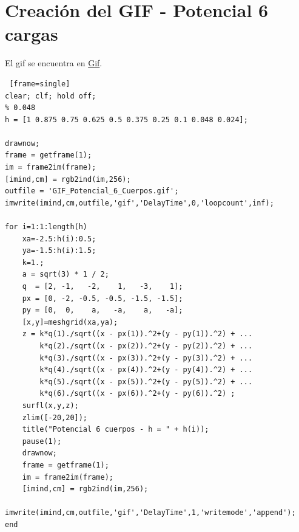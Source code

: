 \documentclass{article}
\begin{document}
\clearpage
\newpage

  
\section{Creación del GIF - Potencial 6 cargas}

El gif se encuentra en \textcolor{blue}{  \href{https://drive.google.com/file/d/1sRfifJXut2_qK32Unls1aUzsKwR2ppvl/view?usp=sharing}{Gif}}.
  
  
\begin{lstlisting} [frame=single]
clear; clf; hold off;
% 0.048
h = [1 0.875 0.75 0.625 0.5 0.375 0.25 0.1 0.048 0.024];

drawnow;
frame = getframe(1);
im = frame2im(frame);        
[imind,cm] = rgb2ind(im,256);       
outfile = 'GIF_Potencial_6_Cuerpos.gif';
imwrite(imind,cm,outfile,'gif','DelayTime',0,'loopcount',inf);

for i=1:1:length(h)
    xa=-2.5:h(i):0.5;
    ya=-1.5:h(i):1.5;
    k=1.; 
    a = sqrt(3) * 1 / 2;
    q  = [2, -1,   -2,    1,   -3,    1];
    px = [0, -2, -0.5, -0.5, -1.5, -1.5];
    py = [0,  0,    a,   -a,    a,   -a];
    [x,y]=meshgrid(xa,ya);
    z = k*q(1)./sqrt((x - px(1)).^2+(y - py(1)).^2) + ...
        k*q(2)./sqrt((x - px(2)).^2+(y - py(2)).^2) + ...
        k*q(3)./sqrt((x - px(3)).^2+(y - py(3)).^2) + ...
        k*q(4)./sqrt((x - px(4)).^2+(y - py(4)).^2) + ...
        k*q(5)./sqrt((x - px(5)).^2+(y - py(5)).^2) + ...
        k*q(6)./sqrt((x - px(6)).^2+(y - py(6)).^2) ;
    surfl(x,y,z);
    zlim([-20,20]); 
    title("Potencial 6 cuerpos - h = " + h(i));
    pause(1);
    drawnow;
    frame = getframe(1);
    im = frame2im(frame);        
    [imind,cm] = rgb2ind(im,256);       
    imwrite(imind,cm,outfile,'gif','DelayTime',1,'writemode','append');
end
\end{lstlisting}
\end{document}
